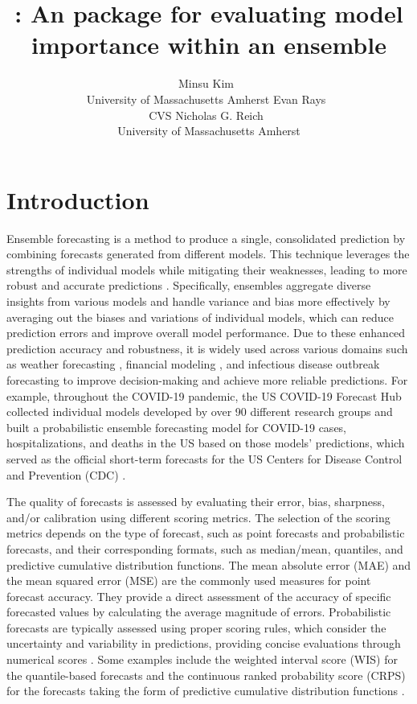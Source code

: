 \documentclass[
  article,
  shortnames,
  notitle]{jss}
\author{Minsu Kim~\orcidlink{0009-0008-4637-3589}\\University of
Massachusetts Amherst \And Evan
Rays~\orcidlink{0000-0003-4035-0243}\\CVS \AND Nicholas G.
Reich~\orcidlink{0000-0003-3503-9899}\\University of Massachusetts
Amherst}
\title{\pkg{modelimportance}: An \proglang{R} package for evaluating
model importance within an ensemble}
\begin{document}
\maketitle


\section{Introduction}\label{sec:intro}

Ensemble forecasting is a method to produce a single, consolidated
prediction by combining forecasts generated from different models. This
technique leverages the strengths of individual models while mitigating
their weaknesses, leading to more robust and accurate predictions
\citep{gneiting2005weather, hastie01statisticallearning, lutz_applying_2019, viboud_rapidd_2018}.
Specifically, ensembles aggregate diverse insights from various models
and handle variance and bias more effectively by averaging out the
biases and variations of individual models, which can reduce prediction
errors and improve overall model performance. Due to these enhanced
prediction accuracy and robustness, it is widely used across various
domains such as weather forecasting
\citep{Guerra_2020, gneiting2005weather}, financial modeling
\citep{SUN2020101160, math11041054}, and infectious disease outbreak
forecasting \citep{ray_prediction_2018, reich_accuracy_2019} to improve
decision-making and achieve more reliable predictions. For example,
throughout the COVID-19 pandemic, the US COVID-19 Forecast Hub collected
individual models developed by over 90 different research groups and
built a probabilistic ensemble forecasting model for COVID-19 cases,
hospitalizations, and deaths in the US based on those models'
predictions, which served as the official short-term forecasts for the
US Centers for Disease Control and Prevention (CDC) \citep{kim2024}.

The quality of forecasts is assessed by evaluating their error, bias,
sharpness, and/or calibration using different scoring metrics. The
selection of the scoring metrics depends on the type of forecast, such
as point forecasts and probabilistic forecasts, and their corresponding
formats, such as median/mean, quantiles, and predictive cumulative
distribution functions. The mean absolute error (MAE) and the mean
squared error (MSE) are the commonly used measures for point forecast
accuracy. They provide a direct assessment of the accuracy of specific
forecasted values by calculating the average magnitude of errors.
Probabilistic forecasts are typically assessed using proper scoring
rules, which consider the uncertainty and variability in predictions,
providing concise evaluations through numerical scores
\citep{gneiting_strictly_2007}. Some examples include the weighted
interval score (WIS) for the quantile-based forecasts and the continuous
ranked probability score (CRPS) for the forecasts taking the form of
predictive cumulative distribution functions
\citep{bracher_evaluating_2021}.
\end{document}
